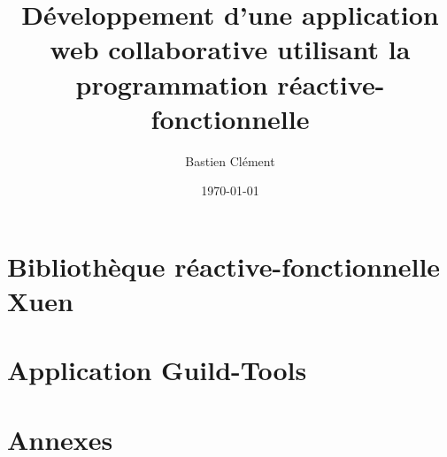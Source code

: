 \documentclass[11pt, a4paper, twoside, frenchb]{book}
\title{Développement d'une application web collaborative utilisant la programmation réactive-fonctionnelle}
\author{Bastien Clément}
\date{\today}
\begin{document}
\maketitle
\tableofcontents



\part[Bibliothèque réactive-fonctionnelle]{Bibliothèque réactive-fonctionnelle \\
	\vspace{1cm} {\normalfont Xuen}}


%
%
%

\part{Application Guild-Tools}


\part{Annexes}




\end{document}
